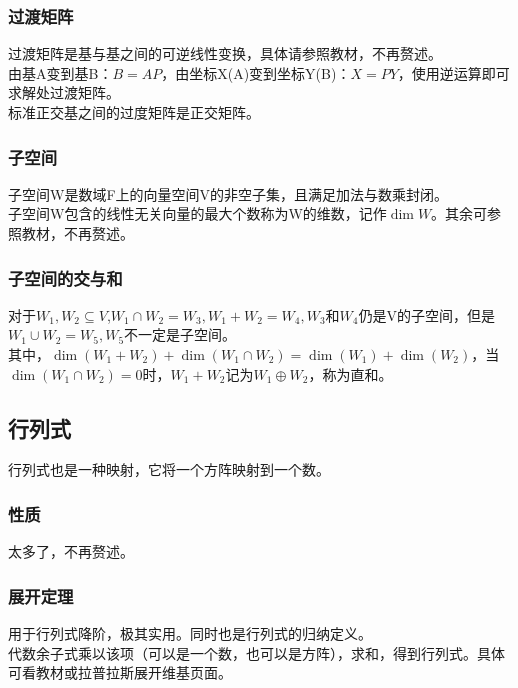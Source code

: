 \documentclass[UTF8]{ctexart}
\begin{document}
\subsubsection{过渡矩阵}
过渡矩阵是基与基之间的可逆线性变换，具体请参照教材，不再赘述。\\
\indent
由基A变到基B：$B=AP$，由坐标X(A)变到坐标Y(B)：$X=PY$，使用逆运算即可求解处过渡矩阵。\\
\indent
标准正交基之间的过度矩阵是正交矩阵。
\subsubsection{子空间}
子空间W是数域F上的向量空间V的非空子集，且满足加法与数乘封闭。\\
\indent
子空间W包含的线性无关向量的最大个数称为W的维数，记作$ \dim W $。其余可参照教材，不再赘述。
\subsubsection{子空间的交与和}
对于$W_1,W_2\subseteq V$,$W_1\cap W_2=W_3,W_1+W_2=W_4,W_3$和$W_4$仍是V的子空间，但是$W_1\cup W_2=W_5,W_5$不一定是子空间。\\
\indent
其中，$\dim(W_1+W_2)+\dim(W_1\cap W_2)=\dim(W_1)+\dim(W_2)$，当$\dim(W_1\cap W_2)=0$时，$W_1+W_2$记为$W_1\oplus W_2$，称为直和。\\
\subsection{行列式}
行列式也是一种映射，它将一个方阵映射到一个数。\\
\indent
\subsubsection{性质}
太多了，不再赘述。
\subsubsection{展开定理}
用于行列式降阶，极其实用。同时也是行列式的归纳定义。\\
\indent
代数余子式乘以该项（可以是一个数，也可以是方阵），求和，得到行列式。具体可看教材或拉普拉斯展开维基页面。
\end{document}
